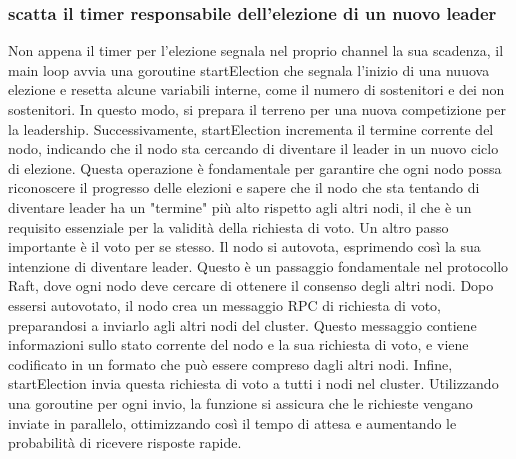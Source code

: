 \subsubsection{scatta il timer responsabile dell'elezione di un nuovo leader}
Non appena il timer per l'elezione segnala nel proprio channel la sua scadenza, il main loop avvia una goroutine startElection che segnala l'inizio di una nuuova elezione e resetta alcune variabili interne, come il numero di 
sostenitori e dei non sostenitori. In questo modo, si prepara il terreno per una nuova competizione per la leadership.
Successivamente, startElection incrementa il termine corrente del nodo, indicando che il nodo sta cercando di diventare il leader in un nuovo ciclo di elezione. Questa operazione è fondamentale per garantire che ogni nodo 
possa riconoscere il progresso delle elezioni e sapere che il nodo che sta tentando di diventare leader ha un "termine" più alto rispetto agli altri nodi, il che è un requisito essenziale per la validità della richiesta di voto.
Un altro passo importante è il voto per se stesso. Il nodo si autovota, esprimendo così la sua intenzione di diventare leader. Questo è un passaggio fondamentale nel protocollo Raft, dove ogni nodo deve cercare di ottenere il 
consenso degli altri nodi.
Dopo essersi autovotato, il nodo crea un messaggio RPC di richiesta di voto, preparandosi a inviarlo agli altri nodi del cluster. Questo messaggio contiene informazioni sullo stato corrente del nodo e la sua richiesta di voto, e viene codificato in un formato che può essere compreso dagli altri nodi.
Infine, startElection invia questa richiesta di voto a tutti i nodi nel cluster. Utilizzando una goroutine per ogni invio, la funzione si assicura che le richieste vengano inviate in parallelo, ottimizzando così il tempo di 
attesa e aumentando le probabilità di ricevere risposte rapide.

